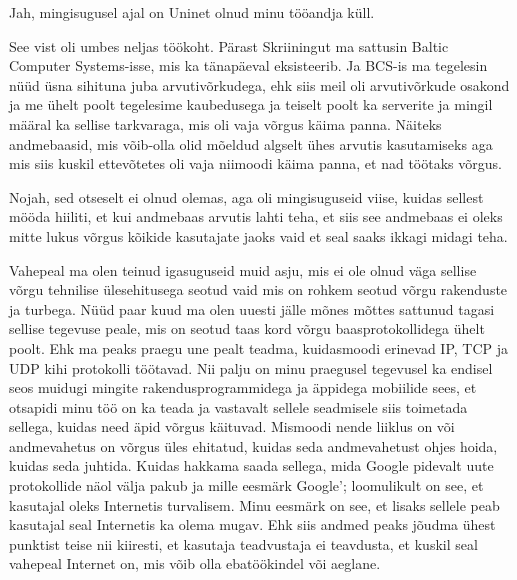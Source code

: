 
Jah, mingisugusel ajal on Uninet  olnud minu tööandja küll.


See vist oli umbes neljas töökoht. Pärast Skriiningut ma sattusin Baltic Computer Systems-isse, mis ka tänapäeval eksisteerib. Ja BCS-is ma tegelesin  nüüd üsna sihituna juba arvutivõrkudega, ehk siis meil oli arvutivõrkude osakond ja me  ühelt poolt tegelesime kaubedusega ja teiselt poolt  ka serverite ja mingil määral ka sellise tarkvaraga, mis  oli vaja võrgus käima panna. Näiteks andmebaasid, mis võib-olla olid mõeldud algselt ühes arvutis kasutamiseks aga mis siis kuskil ettevõtetes oli vaja niimoodi käima panna, et nad töötaks võrgus. 


Nojah, sed otseselt ei olnud olemas, aga oli mingisuguseid viise, kuidas sellest mööda hiiliti, et  kui andmebaas arvutis lahti teha, et siis see andmebaas ei oleks mitte lukus võrgus kõikide kasutajate jaoks vaid et seal saaks ikkagi midagi teha. 


Vahepeal ma olen teinud igasuguseid muid asju, mis ei ole olnud väga sellise võrgu tehnilise ülesehitusega seotud vaid mis on rohkem seotud võrgu rakenduste ja turbega. Nüüd paar kuud ma olen uuesti jälle mõnes mõttes sattunud tagasi sellise tegevuse peale, mis on seotud taas kord võrgu baasprotokollidega ühelt poolt. Ehk  ma peaks praegu une pealt teadma, kuidasmoodi erinevad IP,  TCP  ja UDP kihi protokolli töötavad. Nii palju on minu praegusel tegevusel ka endisel seos muidugi mingite rakendusprogrammidega ja äppidega  mobiilide sees, et otsapidi minu töö on ka teada ja vastavalt sellele seadmisele siis toimetada sellega, kuidas need äpid võrgus käituvad. Mismoodi nende liiklus on või  andmevahetus on võrgus üles ehitatud, kuidas seda andmevahetust ohjes hoida, kuidas seda juhtida. Kuidas hakkama saada sellega, mida Google pidevalt uute protokollide näol välja pakub ja mille eesmärk Google'; loomulikult on see, et kasutajal oleks Internetis turvalisem. Minu eesmärk on see, et lisaks sellele  peab kasutajal seal Internetis ka olema mugav. Ehk siis andmed peaks jõudma ühest punktist teise nii kiiresti, et kasutaja teadvustaja ei teavdusta, et  kuskil seal vahepeal Internet on, mis võib olla ebatöökindel või aeglane.

